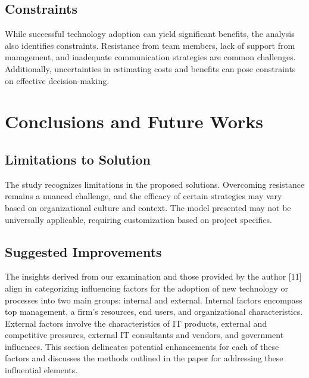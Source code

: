 \documentclass{article}
\begin{document}
\subsection{Constraints}
While successful technology adoption can yield significant benefits, the analysis also identifies constraints. Resistance from team members, lack of support from management, and inadequate communication strategies are common challenges. Additionally, uncertainties in estimating costs and benefits can pose constraints on effective decision-making.

\section{Conclusions and Future Works}
\subsection{Limitations to Solution}
The study recognizes limitations in the proposed solutions. Overcoming resistance remains a nuanced challenge, and the efficacy of certain strategies may vary based on organizational culture and context. The model presented may not be universally applicable, requiring customization based on project specifics.

\subsection{Suggested Improvements}

The insights derived from our examination and those provided by the author [11] align in categorizing influencing factors for the adoption of new technology or processes into two main groups: internal and external. Internal factors encompass top management, a firm's resources, end users, and organizational characteristics. External factors involve the characteristics of IT products, external and competitive pressures, external IT consultants and vendors, and government influences. This section delineates potential enhancements for each of these factors and discusses the methods outlined in the paper for addressing these influential elements.
\end{document}
